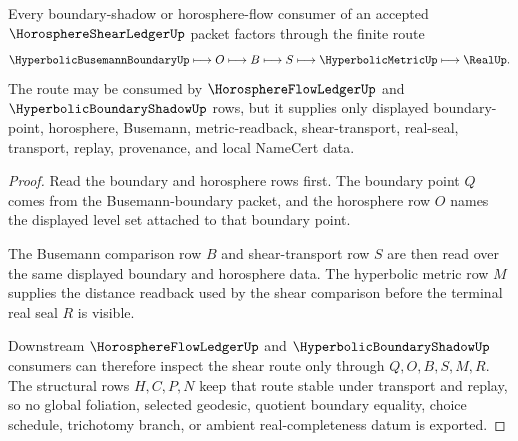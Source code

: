 \begin{theorem}
\label{thm:horosphere-shear-ledger-transport-route}
Every boundary-shadow or horosphere-flow consumer of an accepted $\HorosphereShearLedgerUp$ packet factors through the finite route
$$
\HyperbolicBusemannBoundaryUp \longmapsto O \longmapsto B \longmapsto S \longmapsto \HyperbolicMetricUp \longmapsto \RealUp .
$$
The route may be consumed by $\HorosphereFlowLedgerUp$ and $\HyperbolicBoundaryShadowUp$ rows, but it supplies only displayed boundary-point, horosphere, Busemann, metric-readback, shear-transport, real-seal, transport, replay, provenance, and local NameCert data.
\end{theorem}
\begin{proof}
Read the boundary and horosphere rows first. The boundary point $Q$ comes from the Busemann-boundary packet, and the horosphere row $O$ names the displayed level set attached to that boundary point.

The Busemann comparison row $B$ and shear-transport row $S$ are then read over the same displayed boundary and horosphere data. The hyperbolic metric row $M$ supplies the distance readback used by the shear comparison before the terminal real seal $R$ is visible.

Downstream $\HorosphereFlowLedgerUp$ and $\HyperbolicBoundaryShadowUp$ consumers can therefore inspect the shear route only through $Q,O,B,S,M,R$. The structural rows $H,C,P,N$ keep that route stable under transport and replay, so no global foliation, selected geodesic, quotient boundary equality, choice schedule, trichotomy branch, or ambient real-completeness datum is exported.
\end{proof}


\begin{closurestatus}{\HorosphereShearLedgerUp}
  \theoryclosure{\seedClosure}
  \formalstatus{\unformalizedV}
\end{closurestatus}

